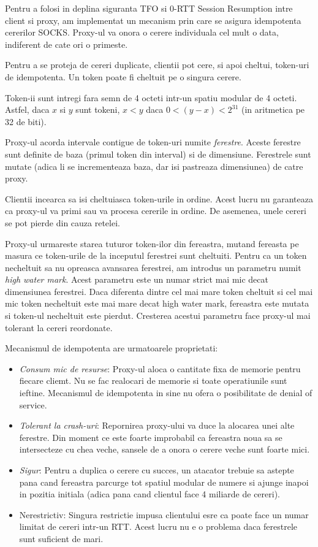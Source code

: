 Pentru a folosi in deplina siguranta TFO si 0-RTT Session Resumption intre client si proxy, am implementat un mecanism
prin care se asigura idempotenta cererilor SOCKS. Proxy-ul va onora o cerere individuala cel mult o data, indiferent de cate
ori o primeste.

Pentru a se proteja de cereri duplicate, clientii pot cere, si apoi cheltui, token-uri de idempotenta. Un token poate fi cheltuit pe o singura cerere.

Token-ii sunt intregi fara semn de 4 octeti intr-un spatiu modular de 4 octeti. Astfel, daca \(x\) si \(y\) sunt tokeni, \(x < y\) daca \( 0 < (y - x) < 2^{31} \) (in aritmetica pe 32 de biti).

Proxy-ul acorda intervale contigue de token-uri numite \emph{ferestre}. Aceste ferestre sunt definite de baza (primul token din interval) si de dimensiune.
Ferestrele sunt mutate (adica li se incrementeaza baza, dar isi pastreaza dimensiunea) de catre proxy.

Clientii incearca sa isi cheltuiasca token-urile in ordine. Acest lucru nu garanteaza ca proxy-ul va primi sau va procesa cererile in ordine. De asemenea, unele cereri se pot pierde din cauza retelei.

Proxy-ul urmareste starea tuturor token-ilor din fereastra, mutand fereasta pe masura ce token-urile de la inceputul ferestrei sunt cheltuiti.
Pentru ca un token necheltuit sa nu opreasca avansarea ferestrei, am introdus un parametru numit \emph{high water mark}. Acest parametru
este un numar strict mai mic decat dimensiunea ferestrei. Daca diferenta dintre cel mai mare token cheltuit si cel mai mic token necheltuit este mai
mare decat high water mark, fereastra este mutata si token-ul necheltuit este pierdut. Cresterea acestui parametru face proxy-ul mai tolerant la cereri reordonate.

Mecanismul de idempotenta are urmatoarele proprietati:
\begin{itemize}
    \item \emph{Consum mic de resurse}: Proxy-ul aloca o cantitate fixa de memorie pentru fiecare cliemt. Nu se fac realocari de memorie si toate operatiunile sunt ieftine.
    Mecanismul de idempotenta in sine nu ofera o posibilitate de denial of service.
    \item \emph{Tolerant la crash-uri}: Repornirea proxy-ului va duce la alocarea unei alte ferestre. Din moment ce este foarte improbabil ca
    fereastra noua sa se intersecteze cu chea veche, sansele de a onora o cerere veche sunt foarte mici.
    \item \emph{Sigur}: Pentru a duplica o cerere cu succes, un atacator trebuie sa astepte pana cand fereastra parcurge tot spatiul modular de numere si ajunge inapoi in pozitia initiala
    (adica pana cand clientul face 4 miliarde de cereri).
    \item {Nerestrictiv}: Singura restrictie impusa clientului esre ca poate face un numar limitat de cereri intr-un RTT. Acest lucru nu e o problema daca ferestrele sunt suficient de mari.
\end{itemize}


